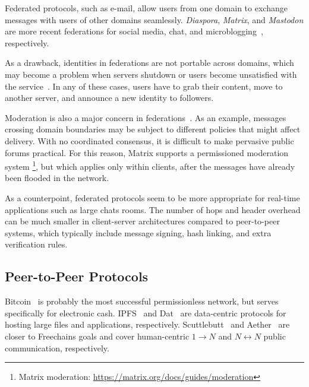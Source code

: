 \documentclass[10pt,journal,compsoc]{IEEEtran}
\newcommand{\FC}       {Freechains\xspace}
\newcommand{\Xon} {$1{\rightarrow}N$\xspace}
\newcommand{\Xnn} {$N{\leftrightarrow}N$\xspace}
\begin{document}
Federated protocols, such as e-mail, allow users from one domain to exchange
messages with users of other domains seamlessly.
\emph{Diaspora}, \emph{Matrix}, and \emph{Mastodon} are more recent
federations for social media, chat, and microblogging~\cite{p2p.ecosystem},
respectively.

As a drawback, identities in federations are not portable across domains, which
may become a problem when servers shutdown or users become unsatisfied with the
service~\cite{fed.distributed}.
In any of these cases, users have to grab their content, move to another
server, and announce a new identity to followers.

Moderation is also a major concern in federations~\cite{p2p.ecosystem}.
As an example, messages crossing domain boundaries may be subject to different
policies that might affect delivery.
With no coordinated consensus, it is difficult to make pervasive public forums
practical.
%
For this reason, Matrix supports a permissioned moderation system%
\footnote{Matrix moderation: \url{https://matrix.org/docs/guides/moderation}},
but which applies only within clients, after the messages have already been
flooded in the network.

As a counterpoint, federated protocols seem to be more appropriate for
real-time applications such as large chats rooms.
The number of hops and header overhead can be much smaller in client-server
architectures compared to peer-to-peer systems, which typically include message
signing, hash linking, and extra verification rules.

\subsection{Peer-to-Peer Protocols}

Bitcoin~\cite{p2p.bitcoin} is probably the most successful permissionless
network, but serves specifically for electronic cash.
IPFS~\cite{p2p.ipfs} and Dat~\cite{p2p.dat} are data-centric protocols for
hosting large files and applications, respectively.
Scuttlebutt~\cite{p2p.scuttlebutt} and Aether~\cite{p2p.ecosystem} are closer
to \FC goals and cover human-centric \Xon and \Xnn public communication,
respectively.
\end{document}
